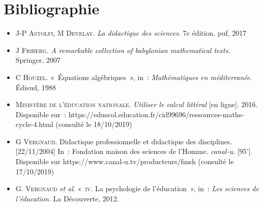 \documentclass{report}
\theoremstyle{definition}
\begin{document}
\newpage

\section*{Bibliographie}

\begin{itemize}
\item \textsc{J-P Astolfi, M Develay}. \textit{La didactique des sciences}. 7e édition. puf, 2017
\item \textsc{J Friberg}. \textit{A remarkable collection of babylonian mathematical texts}. Springer, 2007
\item \textsc{C Houzel}. «~Équations algébriques~», in~: \textit{Mathématiques en méditerranée}. Édisud, 1988
\item \textsc{Ministère de l'éducation nationale}. \textit{Utiliser le calcul littéral} [en ligne]. 2016. Disponible sur~: https://eduscol.education.fr/cid99696/ressources-maths-cycle-4.html (consulté le 18/10/2019)
\item \textsc{G Vergnaud}. Didactique professionnelle et didactique des disciplines. [22/11/2004] In~: Fondation maison des sciences de l'Homme. \textit{canal-u}. [95']. Disponible sur https://www.canal-u.tv/producteurs/fmsh (consulté le 17/10/2019)
\item G. \textsc{Vergnaud} \textit{et al}. «~\textsc{iv}. La psychologie de l'éducation~», in~: \textit{Les sciences de l’éducation}. La Découverte, 2012.
\end{itemize}
\end{document}
